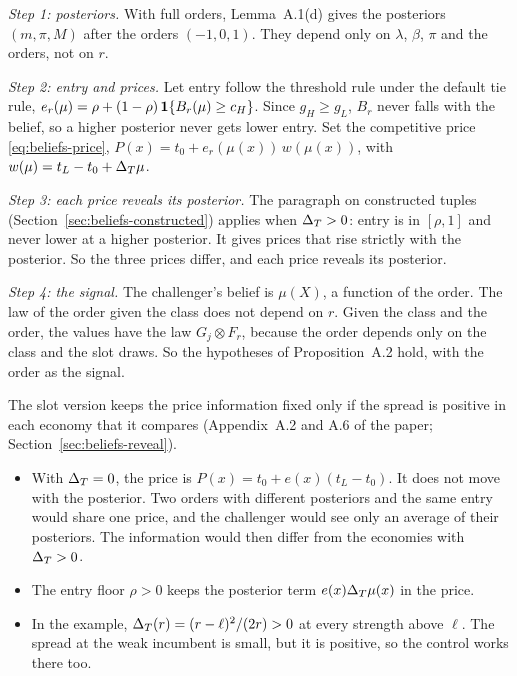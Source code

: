 \begin{derivation}
\emph{Step 1: posteriors.} With full orders, Lemma~A.1(d) gives the posteriors \((m,\pi,M)\) after the orders
\((-1,0,1)\). They depend only on \(\lambda\), \(\beta\), \(\pi\) and the orders, not on \(r\).

\emph{Step 2: entry and prices.} Let entry follow the threshold rule under the default tie rule,
\(e_r(\mu)=\rho+(1-\rho)\,\mathbf{1}\{B_r(\mu)\ge c_H\}\). Since \(g_H\ge g_L\), \(B_r\) never falls with the belief, so a
higher posterior never gets lower entry. Set the competitive price \eqref{eq:beliefs-price},
\(P(x)=t_0+e_r(\mu(x))\,w(\mu(x))\), with \(w(\mu)=t_L-t_0+\Delta_T\mu\).

\emph{Step 3: each price reveals its posterior.} The paragraph on constructed tuples
(Section~\ref{sec:beliefs-constructed}) applies when \(\Delta_T>0\): entry is in \([\rho,1]\) and never lower at a higher
posterior. It gives prices that rise strictly with the posterior. So the three prices differ, and each price reveals
its posterior.

\emph{Step 4: the signal.} The challenger's belief is \(\mu(X)\), a function of the order. The law of the order given
the class does not depend on \(r\). Given the class and the order, the values have the law \(G_j\otimes F_r\),
because the order depends only on the class and the slot draws. So the hypotheses of Proposition~A.2 hold, with the
order as the signal.
\end{derivation}

\begin{watchout}
The slot version keeps the price information fixed only if the spread is positive in each economy that it compares
(Appendix~A.2 and A.6 of the paper; Section~\ref{sec:beliefs-reveal}).
\begin{itemize}
\item With \(\Delta_T=0\), the price is \(P(x)=t_0+e(x)(t_L-t_0)\). It does not move with the posterior. Two orders with
  different posteriors and the same entry would share one price, and the challenger would see only an average of
  their posteriors. The information would then differ from the economies with \(\Delta_T>0\).
\item The entry floor \(\rho>0\) keeps the posterior term \(e(x)\Delta_T\mu(x)\) in the price.
\item In the example, \(\Delta_T(r)=(r-\ell)^2/(2r)>0\) at every strength above \(\ell\). The spread at the weak
  incumbent is small, but it is positive, so the control works there too.
\end{itemize}
\end{watchout}

